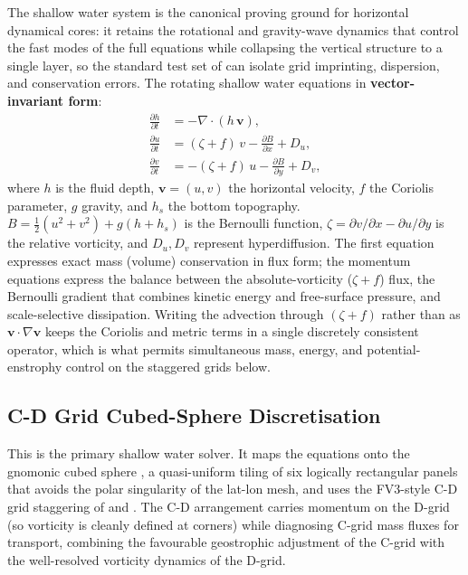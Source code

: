 \documentclass[11pt,twoside]{report}
\newcommand{\pp}{\partial}
\newcommand{\half}{\tfrac{1}{2}}
\newcommand{\vect}[1]{\bm{#1}}
\newcommand{\grad}{\nabla}
\newcommand{\divg}{\nabla\!\cdot\!}
\begin{document}
The shallow water system is the canonical proving ground for horizontal
dynamical cores: it retains the rotational and gravity-wave dynamics that
control the fast modes of the full equations while collapsing the vertical
structure to a single layer, so the standard test set of \citet{Williamson1992}
can isolate grid imprinting, dispersion, and conservation errors. The rotating
shallow water equations in \textbf{vector-invariant form}:
\begin{align}
  \frac{\pp h}{\pp t} &= -\divg(h\,\vect{v}),
  \label{eq:sw-mass}\\
  \frac{\pp u}{\pp t} &= (\zeta+f)\,v - \frac{\pp B}{\pp x} + D_u,
  \label{eq:sw-u}\\
  \frac{\pp v}{\pp t} &= -(\zeta+f)\,u - \frac{\pp B}{\pp y} + D_v,
  \label{eq:sw-v}
\end{align}
where $h$ is the fluid depth, $\vect{v}=(u,v)$ the horizontal velocity,
$f$ the Coriolis parameter, $g$ gravity, and $h_s$ the bottom topography.
$B=\half(u^2+v^2)+g(h+h_s)$ is the Bernoulli function,
$\zeta=\pp v/\pp x - \pp u/\pp y$ is the relative vorticity,
and $D_u,D_v$ represent hyperdiffusion. The first equation expresses exact mass
(volume) conservation in flux form; the momentum equations express the balance
between the absolute-vorticity ($\zeta+f$) flux, the Bernoulli gradient that
combines kinetic energy and free-surface pressure, and scale-selective
dissipation. Writing the advection through $(\zeta+f)$ rather than as
$\vect{v}\cdot\grad\vect{v}$ keeps the Coriolis and metric terms in a single
discretely consistent operator, which is what permits simultaneous mass,
energy, and potential-enstrophy control on the staggered grids below.

\subsection{C-D Grid Cubed-Sphere Discretisation}

This is the primary shallow water solver. It maps the equations onto the
gnomonic cubed sphere \citep{Ronchi1996,PutmanLin2007}, a quasi-uniform tiling
of six logically rectangular panels that avoids the polar singularity of the
lat-lon mesh, and uses the FV3-style C-D grid staggering of \citet{Lin2004} and
\citet{PutmanLin2007}. The C-D arrangement carries momentum on the D-grid (so
vorticity is cleanly defined at corners) while diagnosing C-grid mass fluxes for
transport, combining the favourable geostrophic adjustment of the C-grid with
the well-resolved vorticity dynamics of the D-grid.
\end{document}
